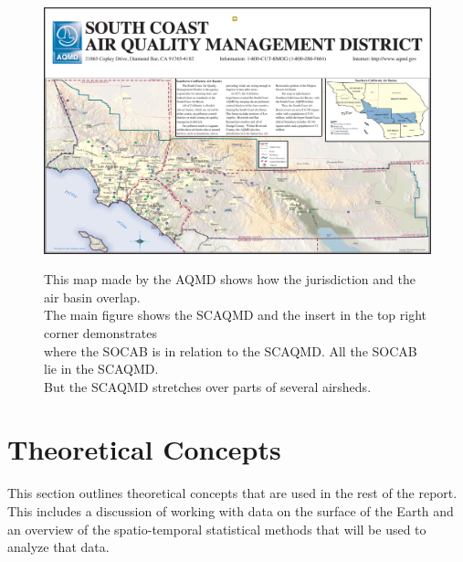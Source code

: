 \documentclass{article}
\begin{document}
	\begin{landscape}
		\begin{figure}[ht]
			\captionsetup{justification=centering}
			\caption{This map made by the \ac{AQMD} shows how the jurisdiction and the air basin overlap.\\  The main figure shows the \ac{SCAQMD} and the insert in the top right corner demonstrates \\where the \ac{SOCAB} is in relation to the \ac{SCAQMD}. All the \ac{SOCAB} lie in the \ac{SCAQMD}.\\ But the \ac{SCAQMD} stretches over parts of several airsheds.  
			}
			\centering
			\includegraphics[width = \textwidth]{Figures/map-of-jurisdiction.pdf}
			\label{fig:SCAQMD-jurisdiction}
		\end{figure}
	\end{landscape}
	
	
	
	
	\section{Theoretical Concepts}
	\label{sec:theory}
	This section outlines theoretical concepts that are used in the rest of the report. This includes a discussion of working with data on the surface of the Earth and an overview of the spatio-temporal statistical methods that will be used to analyze that data.
	
\end{document}
